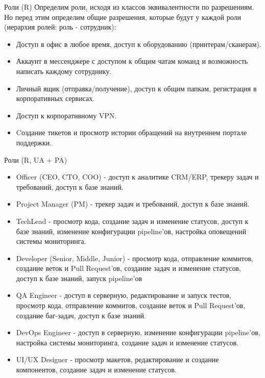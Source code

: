 \documentclass[10pt]{beamer}
\begin{document}
\begin{frame}{Роли (R)}
    Определим роли, исходя из классов эквивалентности по разрешениям. Но перед этим определим общие разрешения, которые будут у каждой роли (иерархия ролей: роль - сотрудник):
    \begin{itemize}
        \item Доступ в офис в любое время, доступ к оборудованию (принтерам/сканерам).
        \item Аккаунт в мессенджере с доступом к общим чатам команд и возможность написать каждому сотруднику.
        \item Личный ящик (отправка/получение), доступ к общим папкам, регистрация в корпоративных сервисах.
        \item Доступ к корпоративному VPN.
        \item Cоздание тикетов и просмотр истории обращений на внутреннем портале поддержки.
    \end{itemize}
\end{frame}

\begin{frame}{Роли (R, UA + PA)}
    \begin{itemize}
        \item Officer (CEO, CTO, COO) - доступ к аналитике CRM/ERP, трекеру задач и требований, доступ к базе знаний.
        \item Project Manager (PM) - трекер задач и требований, доступ к базе знаний.
        \item TechLead - просмотр кода, создание задач и изменение статусов, доступ к базе знаний, изменение конфигурации pipeline'ов, настройка оповещений системы мониторинга.
        \item Developer (Senior, Middle, Junior) - просмотр кода, отправление коммитов, создание веток и Pull Request'ов, создание задач и изменение статусов, доступ к базе знаний, запуск pipeline'ов
        \item QA Engineer - доступ в серверную, редактирование и запуск тестов, просмотр кода, отправление коммитов, создание веток и Pull Request'ов, создание баг-задач, доступ к базе знаний.
        \item DevOps Engineer - доступ в серверную, изменение конфигурации pipeline'ов, настройка системы мониторинга, создание задач и изменение статусов.
        \item UI/UX Designer - просмотр макетов, редактирование и создание компонентов, создание задач и изменение статусов.
    \end{itemize}
\end{frame}
\end{document}
